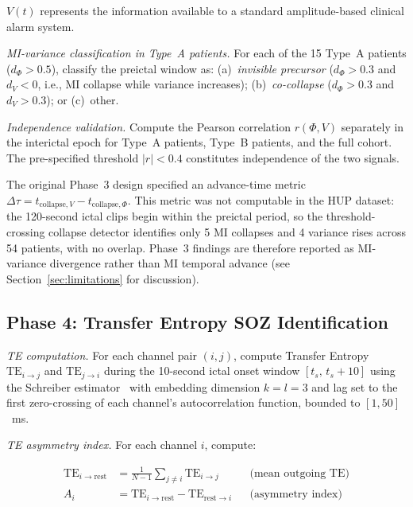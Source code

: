 \documentclass[final,5p,times,twocolumn]{elsarticle}
\begin{document}
$V(t)$ represents the information available to a standard amplitude-based
clinical alarm system.

\textit{MI-variance classification in Type~A patients.}
For each of the 15 Type~A patients ($d_\Phi > 0.5$), classify the
preictal window as: (a)~\textit{invisible precursor} ($d_\Phi > 0.3$
and $d_V < 0$, i.e., MI collapse while variance increases);
(b)~\textit{co-collapse} ($d_\Phi > 0.3$ and $d_V > 0.3$); or
(c)~other.

\textit{Independence validation.}
Compute the Pearson correlation $r(\Phi, V)$ separately in the
interictal epoch for Type~A patients, Type~B patients, and the full
cohort.
%
The pre-specified threshold $|r| < 0.4$ constitutes independence of the
two signals.

The original Phase~3 design specified an advance-time metric
$\Delta\tau = t_{\text{collapse},V} - t_{\text{collapse},\Phi}$.
%
This metric was not computable in the HUP dataset: the 120-second
ictal clips begin within the preictal period, so the
threshold-crossing collapse detector identifies only 5 MI collapses and
4 variance rises across 54 patients, with no overlap.
%
Phase~3 findings are therefore reported as MI-variance divergence
rather than MI temporal advance (see Section~\ref{sec:limitations} for
discussion).

\subsection{Phase 4: Transfer Entropy SOZ Identification}
\label{sec:phase4}

\textit{TE computation.}
For each channel pair $(i, j)$, compute Transfer Entropy
$\mathrm{TE}_{i \to j}$ and $\mathrm{TE}_{j \to i}$ during the
10-second ictal onset window $[t_s,\, t_s + 10]$ using the Schreiber
estimator~\cite{schreiber2000} with embedding dimension $k = l = 3$ and
lag set to the first zero-crossing of each channel's autocorrelation
function, bounded to $[1, 50]$~ms.

\textit{TE asymmetry index.}
For each channel $i$, compute:

\begin{align}
  \mathrm{TE}_{i \to \mathrm{rest}}
    &= \frac{1}{N-1} \sum_{j \neq i} \mathrm{TE}_{i \to j}
    &&\text{(mean outgoing TE)} \\[4pt]
  A_i
    &= \mathrm{TE}_{i \to \mathrm{rest}}
       - \mathrm{TE}_{\mathrm{rest} \to i}
    &&\text{(asymmetry index)}
\end{align}
\end{document}
